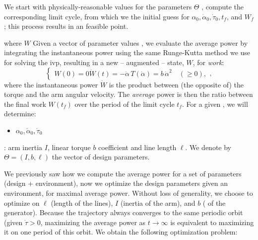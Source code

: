 
We start with physically-reasonable values for the parameters \(\Theta\) , compute the corresponding limit cycle, from which we  the initial guess for \(\alpha_0, \dot \alpha_0, \dot \tau_0, t_f\), and \(W_f\); this process results in an  feasible point.







where \(W\)
Given a vector of parameter values , we evaluate the average power by integrating the instantaneous power using the same Runge-Kutta method we use for solving the \ac{ivp}, resulting in a new -- augmented -- state, \(W\), for \emph{work}:
\begin{equation}
    \begin{cases}
        W(0) = 0
        \dot W(t) = - \dot \alpha \, T(\dot \alpha) = b \, \dot \alpha^2 \quad (\geq 0),
    \end{cases},
\end{equation}
where the instantaneous power \(\dot W\) is the product between (the opposite of) the torque and the arm angular velocity.
The \emph{average} power is then the ratio between the final work \(W(t_f)\) over the period of the limit cycle \(t_f\).
For a given , we will determine:
\begin{itemize}
    \item \(\alpha_0, \dot \alpha_0, \dot \tau_0\)
\end{itemize}

: arm inertia \(I\), linear torque \(b\) coefficient and line length \(\ell\). We denote by \(\Theta = (I, b, \ell)\) the vector of design parameters.

We previously saw how we compute the average power for a set of parameters (design + environment), now we optimize the design parameters given an environment, for maximal average power. Without loss of generality, we choose to optimize on \(\ell\) (length of the lines), \(I\) (inertia of the arm), and \(b\) ( of the generator). Because the trajectory always converges to the same periodic orbit (given \(\dot \tau > 0\), maximizing the average power as \(t \to \infty\) is equivalent to maximizing it on one period of this orbit. We obtain the following optimization problem:


